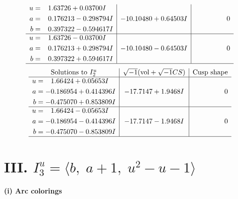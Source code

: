 \documentclass[1p]{elsarticle_modified}
\theoremstyle{definition}
\newcommand{\I}{\sqrt{-1}}
\begin{document}
$$\begin{array}{c|c|c}
\begin{aligned}
u &= \phantom{-}1.63726 + 0.03700 I \\
a &= \phantom{-}0.176213 - 0.298794 I \\
b &= \phantom{-}0.397322 - 0.594617 I\end{aligned}
 & -10.10480 + 0.64503 I & \phantom{-0.000000 } 0 \\ \hline\begin{aligned}
u &= \phantom{-}1.63726 - 0.03700 I \\
a &= \phantom{-}0.176213 + 0.298794 I \\
b &= \phantom{-}0.397322 + 0.594617 I\end{aligned}
 & -10.10480 - 0.64503 I & \phantom{-0.000000 } 0\\
 \hline 
 \end{array}$$\newpage$$\begin{array}{c|c|c}  
\text{Solutions to }I^u_{2}& \I (\text{vol} + \sqrt{-1}CS) & \text{Cusp shape}\\
 \hline 
\begin{aligned}
u &= \phantom{-}1.66424 + 0.05653 I \\
a &= -0.186954 + 0.414396 I \\
b &= -0.475070 + 0.853809 I\end{aligned}
 & -17.7147 + 1.9468 I & \phantom{-0.000000 } 0 \\ \hline\begin{aligned}
u &= \phantom{-}1.66424 - 0.05653 I \\
a &= -0.186954 - 0.414396 I \\
b &= -0.475070 - 0.853809 I\end{aligned}
 & -17.7147 - 1.9468 I & \phantom{-0.000000 } 0\\
 \hline 
 \end{array}$$\newpage\newpage\renewcommand{\arraystretch}{1}
\centering \section*{III. $I^u_{3}= \langle b,\;a+1,\;u^2- u-1 \rangle$}
\flushleft \textbf{(i) Arc colorings}\\
\end{document}
